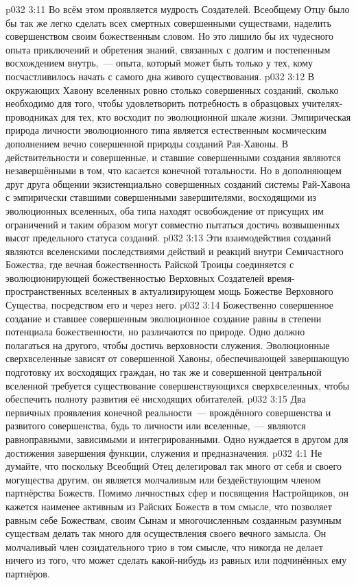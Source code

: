 \vs p032 3:11 Во всём этом проявляется мудрость Создателей. Всеобщему Отцу было бы так же легко сделать всех смертных совершенными существами, наделить совершенством своим божественным словом. Но это лишило бы их чудесного опыта приключений и обретения знаний, связанных с долгим и постепенным восхождением внутрь,~--- опыта, который может быть только у тех, кому посчастливилось начать с самого дна живого существования.
\vs p032 3:12 В окружающих Хавону вселенных ровно столько совершенных созданий, сколько необходимо для того, чтобы удовлетворить потребность в образцовых учителях\hyp{}проводниках для тех, кто восходит по эволюционной шкале жизни. Эмпирическая природа личности эволюционного типа является естественным космическим дополнением вечно совершенной природы созданий Рая\hyp{}Хавоны. В действительности и совершенные, и ставшие совершенными создания являются незавершёнными в том, что касается конечной тотальности. Но в дополняющем друг друга общении экзистенциально совершенных созданий системы Рай\hyp{}Хавона с эмпирически ставшими совершенными завершителями, восходящими из эволюционных вселенных, оба типа находят освобождение от присущих им ограничений и таким образом могут совместно пытаться достичь возвышенных высот предельного статуса созданий.
\vs p032 3:13 Эти взаимодействия созданий являются вселенскими последствиями действий и реакций внутри Семичастного Божества, где вечная божественность Райской Троицы соединяется с эволюционирующей божественностью Верховных Создателей время\hyp{}пространственных вселенных в актуализирующем мощь Божестве Верховного Существа, посредством его и через него.
\vs p032 3:14 Божественно совершенное создание и ставшее совершенным эволюционное создание равны в степени потенциала божественности, но различаются по природе. Одно должно полагаться на другого, чтобы достичь верховности служения. Эволюционные сверхвселенные зависят от совершенной Хавоны, обеспечивающей завершающую подготовку их восходящих граждан, но так же и совершенной центральной вселенной требуется существование совершенствующихся сверхвселенных, чтобы обеспечить полноту развития её нисходящих обитателей.
\vs p032 3:15 Два первичных проявления конечной реальности~--- врождённого совершенства и развитого совершенства, будь то личности или вселенные,~--- являются равноправными, зависимыми и интегрированными. Одно нуждается в другом для достижения завершения функции, служения и предназначения.
\vs p032 4:1 Не думайте, что поскольку Всеобщий Отец делегировал так много от себя и своего могущества другим, он является молчаливым или бездействующим членом партнёрства Божеств. Помимо личностных сфер и посвящения Настройщиков, он кажется наименее активным из Райских Божеств в том смысле, что позволяет равным себе Божествам, своим Сынам и многочисленным созданным разумным существам делать так много для осуществления своего вечного замысла. Он молчаливый член созидательного трио в том смысле, что никогда не делает ничего из того, что может сделать какой\hyp{}нибудь из равных или подчинённых ему партнёров.
